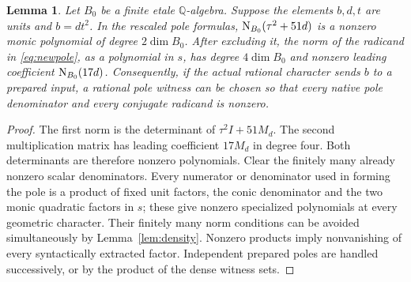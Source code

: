 \documentclass[11pt,a4paper]{article}
\newtheorem{lemma}[theorem]{Lemma}
\theoremstyle{remark}\newtheorem{remark}[theorem]{Remark}
\newcommand{\Q}{\mathbb Q}\newcommand{\Z}{\mathbb Z}\newcommand{\C}{\mathbb C}
\begin{document}
\begin{lemma}\label{lem:avoidance}
Let $B_0$ be a finite etale $\Q$-algebra. Suppose the elements $b,d,t$
are units and $b=dt^2$. In the rescaled pole formulas,
$\operatorname{N}_{B_0}(\tau^2+51d)$ is a nonzero monic polynomial of degree
$2\dim B_0$. After excluding it, the norm of the radicand in
\eqref{eq:newpole}, as a polynomial in $s$, has degree
$4\dim B_0$ and nonzero leading coefficient $\operatorname{N}_{B_0}(17d)$.
Consequently, if the actual rational character sends $b$ to a prepared
input, a rational pole witness can be chosen so that every native
pole denominator and every conjugate radicand is nonzero.
\end{lemma}
\begin{proof}
The first norm is the determinant of $\tau^2I+51M_d$. The second
multiplication matrix has leading coefficient $17M_d$ in degree four.
Both determinants are therefore nonzero polynomials. Clear the finitely
many already nonzero scalar denominators. Every numerator or denominator
used in forming the pole is a product of fixed unit factors, the conic
denominator and the two monic quadratic factors in $s$; these give
nonzero specialized polynomials at every geometric character. Their
finitely many norm conditions can be avoided simultaneously by
Lemma~\ref{lem:density}. Nonzero products imply nonvanishing of every
syntactically extracted factor. Independent prepared poles are handled
successively, or by the product of the dense witness sets.
\end{proof}
\end{document}
